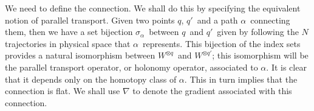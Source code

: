 \documentclass[11pt]{article}
\theoremstyle{remark}
\begin{document}
We need to define the connection. We shall do this by  
specifying the equivalent notion of parallel transport. Given
two points \ensuremath{q}, \ensuremath{q'}\ and a path \ensuremath{\alpha}\ connecting them, then
we have a  set bijection \ensuremath{\ensuremath{\sigma}_{\alpha}}\ between \ensuremath{q}\ and
\ensuremath{q'}\ given by following the $N$ trajectories in physical space that
\ensuremath{\alpha}\ represents. This bijection of the index sets provides a
natural  isomorphism between \ensuremath{{\ensuremath{W}}^{{\otimes}{\ensuremath{q}}}}\ 
and \ensuremath{{\ensuremath{W}}^{{\otimes}{\ensuremath{q}'}}}; this isomorphism will be the parallel transport operator,
or holonomy operator, 
associated to \ensuremath{\alpha}. It is clear that it depends  only on the
homotopy class of \ensuremath{\alpha}.
This in turn implies that the connection is flat. We shall use
$\nabla$ to denote the gradient associated with this
connection.
\end{document}

